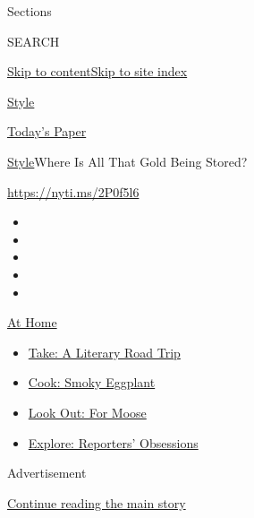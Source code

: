 Sections

SEARCH

\protect\hyperlink{site-content}{Skip to
content}\protect\hyperlink{site-index}{Skip to site index}

\href{https://www.nytimes.com/section/style}{Style}

\href{https://myaccount.nytimes.com/auth/login?response_type=cookie\&client_id=vi}{}

\href{https://www.nytimes.com/section/todayspaper}{Today's Paper}

\href{/section/style}{Style}\textbar{}Where Is All That Gold Being
Stored?

\url{https://nyti.ms/2P0f5l6}

\begin{itemize}
\item
\item
\item
\item
\item
\end{itemize}

\href{https://www.nytimes.com/spotlight/at-home?action=click\&pgtype=Article\&state=default\&region=TOP_BANNER\&context=at_home_menu}{At
Home}

\begin{itemize}
\tightlist
\item
  \href{https://www.nytimes.com/2020/07/28/books/time-for-a-literary-road-trip.html?action=click\&pgtype=Article\&state=default\&region=TOP_BANNER\&context=at_home_menu}{Take:
  A Literary Road Trip}
\item
  \href{https://www.nytimes.com/2020/07/29/magazine/bored-with-your-home-cooking-some-smoky-eggplant-will-fix-that.html?action=click\&pgtype=Article\&state=default\&region=TOP_BANNER\&context=at_home_menu}{Cook:
  Smoky Eggplant}
\item
  \href{https://www.nytimes.com/2020/07/27/travel/moose-michigan-isle-royale.html?action=click\&pgtype=Article\&state=default\&region=TOP_BANNER\&context=at_home_menu}{Look
  Out: For Moose}
\item
  \href{https://www.nytimes.com/interactive/2020/at-home/even-more-reporters-editors-diaries-lists-recommendations.html?action=click\&pgtype=Article\&state=default\&region=TOP_BANNER\&context=at_home_menu}{Explore:
  Reporters' Obsessions}
\end{itemize}

Advertisement

\protect\hyperlink{after-top}{Continue reading the main story}

